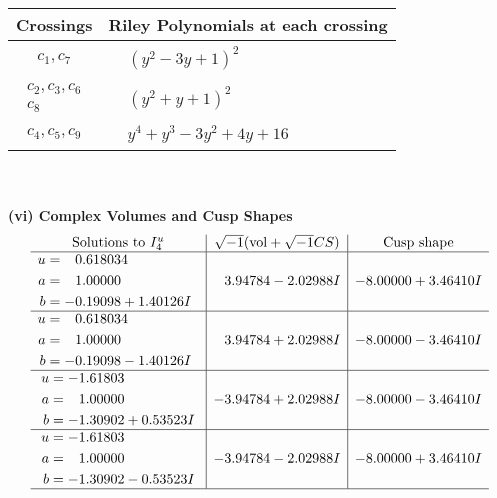 \documentclass[1p]{elsarticle_modified}
\theoremstyle{definition}
\newcommand{\I}{\sqrt{-1}}
\begin{document}
\begin{tabular}{m{50pt}|m{274pt}}
Crossings & \hspace{64pt}Riley Polynomials at each crossing \\
\hline $$\begin{aligned}c_{1},c_{7}\end{aligned}$$&$\begin{aligned}
&(y^2-3 y+1)^2
\end{aligned}$\\
\hline $$\begin{aligned}c_{2},c_{3},c_{6}\\c_{8}\end{aligned}$$&$\begin{aligned}
&(y^2+y+1)^2
\end{aligned}$\\
\hline $$\begin{aligned}c_{4},c_{5},c_{9}\end{aligned}$$&$\begin{aligned}
&y^4+y^3-3 y^2+4 y+16
\end{aligned}$\\
\hline
\end{tabular}\\~\\
\newpage\flushleft \textbf{(vi) Complex Volumes and Cusp Shapes}
$$\begin{array}{c|c|c}  
\text{Solutions to }I^u_{4}& \I (\text{vol} + \sqrt{-1}CS) & \text{Cusp shape}\\
 \hline 
\begin{aligned}
u &= \phantom{-}0.618034\phantom{ +0.000000I} \\
a &= \phantom{-}1.00000\phantom{ +0.000000I} \\
b &= -0.19098 + 1.40126 I\end{aligned}
 & \phantom{-}3.94784 - 2.02988 I & -8.00000 + 3.46410 I \\ \hline\begin{aligned}
u &= \phantom{-}0.618034\phantom{ +0.000000I} \\
a &= \phantom{-}1.00000\phantom{ +0.000000I} \\
b &= -0.19098 - 1.40126 I\end{aligned}
 & \phantom{-}3.94784 + 2.02988 I & -8.00000 - 3.46410 I \\ \hline\begin{aligned}
u &= -1.61803\phantom{ +0.000000I} \\
a &= \phantom{-}1.00000\phantom{ +0.000000I} \\
b &= -1.30902 + 0.53523 I\end{aligned}
 & -3.94784 + 2.02988 I & -8.00000 - 3.46410 I \\ \hline\begin{aligned}
u &= -1.61803\phantom{ +0.000000I} \\
a &= \phantom{-}1.00000\phantom{ +0.000000I} \\
b &= -1.30902 - 0.53523 I\end{aligned}
 & -3.94784 - 2.02988 I & -8.00000 + 3.46410 I\\
 \hline 
 \end{array}$$\newpage\newpage\renewcommand{\arraystretch}{1}
\end{document}
